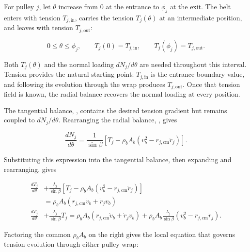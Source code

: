 \documentclass[11pt]{report}
\numberwithin{equation}{section}
\begin{document}
For pulley \(j\), let \(\theta\) increase from \(0\) at the entrance to
\(\phi_j\) at the exit. The belt enters with tension
\(T_{j,\mathrm{in}}\), carries the tension \(T_j(\theta)\) at an intermediate
position, and leaves with tension \(T_{j,\mathrm{out}}\):

\[
    0\leq\theta\leq\phi_j,
    \qquad
    T_j(0)=T_{j,\mathrm{in}},
    \qquad
    T_j(\phi_j)=T_{j,\mathrm{out}}.
\]

Both \(T_j(\theta)\) and the normal loading \(dN_j/d\theta\) are needed
throughout this interval. Tension provides the natural starting point:
\(T_{j,\mathrm{in}}\) is the entrance boundary value, and following its
evolution through the wrap produces \(T_{j,\mathrm{out}}\). Once that tension
field is known, the radial balance recovers the normal loading at every
position.

The tangential balance, , contains the desired
tension gradient but remains coupled to \(dN_j/d\theta\). Rearranging the
radial balance, , gives

\begin{equation}
    \frac{dN_j}{d\theta}
    =
    \frac{1}{\sin\beta}
    \left[
        T_j
        -
        \rho_bA_b
        \left(
            v_b^2-r_{j,\mathrm{cm}}\ddot r_j
        \right)
    \right].
    \label{eq:wrap_normal_gradient}
\end{equation}

Substituting this expression into the tangential balance, then expanding and
rearranging, gives

\begin{align*}
    \frac{dT_j}{d\theta}
    &+
    \frac{\lambda_j}{\sin\beta}
    \left[
        T_j
        -
        \rho_bA_b
        \left(
            v_b^2-r_{j,\mathrm{cm}}\ddot r_j
        \right)
    \right]
    \\
    &=
    \rho_bA_b
    \left(
        r_{j,\mathrm{cm}}\dot v_b
        +
        \dot r_jv_b
    \right)
    \\
    \frac{dT_j}{d\theta}
    &+
    \frac{\lambda_j}{\sin\beta}T_j
    =
    \rho_bA_b
    \left(
        r_{j,\mathrm{cm}}\dot v_b
        +
        \dot r_jv_b
    \right)
    +
    \rho_bA_b
    \frac{\lambda_j}{\sin\beta}
    \left(
        v_b^2-r_{j,\mathrm{cm}}\ddot r_j
    \right).
\end{align*}

Factoring the common \(\rho_bA_b\) on the right gives the local equation that
governs tension evolution through either pulley wrap:
\end{document}
